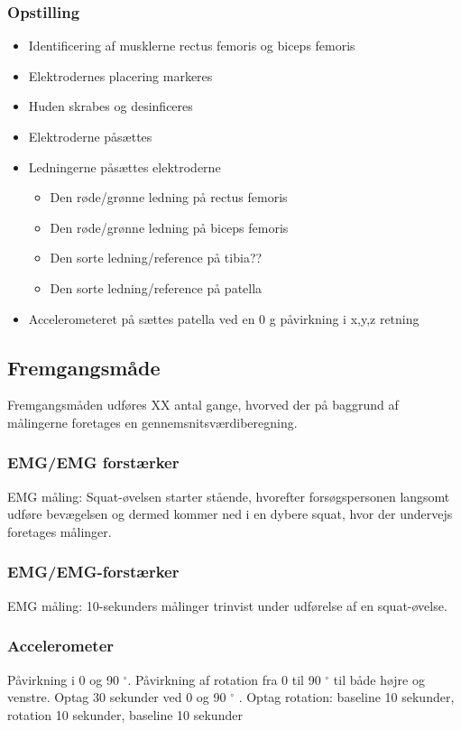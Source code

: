 \subsubsection{Opstilling}
\begin{itemize}
\item Identificering af musklerne rectus femoris og biceps femoris 
\item Elektrodernes placering markeres
\item Huden skrabes og desinficeres
\item Elektroderne påsættes
\item Ledningerne påsættes elektroderne
\begin{itemize}
\item Den røde/grønne ledning på rectus femoris
\item Den røde/grønne ledning på biceps femoris
\item Den sorte ledning/reference på tibia??
\item Den sorte ledning/reference på patella 

\end{itemize} 
\item Accelerometeret på sættes patella ved en 0 g påvirkning i x,y,z retning
\end{itemize}


\subsection{Fremgangsmåde}
Fremgangsmåden udføres XX antal gange, hvorved der på baggrund af målingerne foretages en gennemsnitsværdiberegning.
\subsubsection{EMG/EMG forstærker}
EMG måling: Squat-øvelsen starter stående, hvorefter forsøgspersonen langsomt udføre bevægelsen og dermed kommer ned i en dybere squat, hvor der undervejs foretages målinger.
\subsubsection{EMG/EMG-forstærker}
EMG måling: 10-sekunders målinger trinvist under udførelse af en squat-øvelse. 


\subsubsection{Accelerometer}
Påvirkning i 0 og 90 $^{\circ}$.
Påvirkning af rotation fra 0 til 90 $^{\circ}$ til både højre og venstre.
Optag 30 sekunder ved 0 og 90 $^{\circ}$ .
Optag rotation: baseline 10 sekunder, rotation 10 sekunder, baseline 10 sekunder




